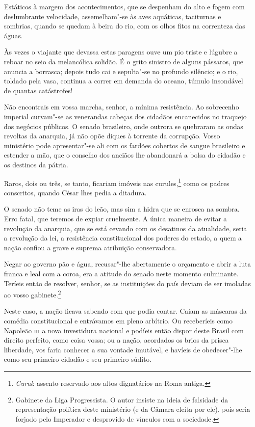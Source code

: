  Estáticos à margem dos acontecimentos, que se despenham do alto e fogem
com deslumbrante velocidade, assemelham"-se às aves aquáticas,
taciturnas e sombrias, quando se quedam à beira do rio, com os olhos
fitos na correnteza das águas. 

 Às vezes o viajante que devassa estas paragens ouve um pio triste e
lúgubre a reboar no seio da melancólica solidão. É o grito sinistro de
alguns pássaros, que anuncia a borrasca; depois tudo cai e sepulta"-se
no profundo silêncio; e o rio, toldado pela vasa, continua a correr em
demanda do oceano, túmulo insondável de quantas catástrofes!

 Não encontrais em vossa marcha, senhor, a mínima resistência. Ao
sobrecenho imperial curvam"-se as venerandas cabeças dos cidadãos
encanecidos no traquejo dos negócios públicos. O senado brasileiro,
onde outrora se quebraram as ondas revoltas da anarquia, já não opõe
diques à torrente da corrupção. Vosso ministério pode apresentar"-se
ali com os fardões cobertos de sangue brasileiro e estender a mão, que
o conselho dos anciãos lhe abandonará a bolsa do cidadão e os destinos da pátria.  

 Raros, dois ou três, se tanto, ficariam imóveis nas
curules,\footnote{ \textit{Curul}: assento reservado aos altos dignatários na Roma antiga.}
 como os padres conscritos, quando César lhes pedia a ditadura. 

 O senado não teme as iras do leão, mas sim a hidra que se enrosca na
sombra. Erro fatal, que teremos de expiar cruelmente. A única maneira
de evitar a revolução da anarquia, que se está cevando com os desatinos
da atualidade, seria a revolução da lei, a resistência constitucional
dos poderes do estado, a quem a nação confiou a grave e suprema
atribuição conservadora. 

 Negar ao governo pão e água, recusar"-lhe abertamente o orçamento e
abrir a luta franca e leal com a coroa, era a atitude do senado neste
momento culminante. Teríeis então de resolver, senhor, se as
instituições do país deviam de ser imoladas ao vosso
gabinete.\footnote{ Gabinete da Liga Progressista. O autor insiste na ideia de falsidade da
representação política deste ministério (e da Câmara eleita por ele),
pois seria forjado pelo Imperador e desprovido de vínculos com a sociedade.}
 

 Neste caso, a nação ficava sabendo com que podia contar. Caiam as
máscaras da comédia constitucional e entrávamos em pleno arbítrio. Ou
receberíeis como Napoleão \textsc{iii} a nova investidura nacional e podíeis
então dispor deste Brasil com direito perfeito, como coisa vossa; ou a
nação, acordados os brios da prisca liberdade, vos faria conhecer a sua
vontade imutável, e havíeis de obedecer"-lhe como seu primeiro cidadão
e seu primeiro súdito. 


